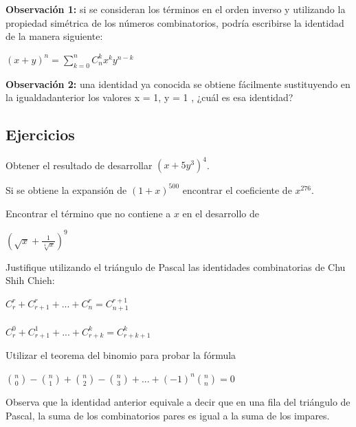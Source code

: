 \textbf{Observación 1:} si se consideran los términos en el orden inverso y utilizando la propiedad simétrica de los números combinatorios, podría escribirse la identidad de la manera siguiente:

\begin{center}
    $(x+y)^n=\displaystyle \sum_{k=0}^{n} C^{k}_{n} x^{k} y^{n-k}$
\end{center}

\textbf{Observación 2:} una identidad ya conocida se obtiene fácilmente sustituyendo en la igualdadanterior los valores x = 1, y = 1 , ¿cuál es esa identidad?

\subsection{Ejercicios}

\begin{ejercicio}
    Obtener el resultado de desarrollar $(x+ 5y^3)^4$.
\end{ejercicio}

\begin{ejercicio}
    Si se obtiene la expansión de $(1 +x)^{500}$ encontrar el coeficiente de $x^{276}$.
\end{ejercicio}

\begin{ejercicio}
    Encontrar el término que no contiene a $x$ en el desarrollo de

    \begin{center}
        $(\sqrt{x} + \frac{1}{\sqrt[4]{x}})^9$
    \end{center}
\end{ejercicio}

\begin{ejercicio}
    Justifique utilizando el triángulo de Pascal las identidades combinatorias de Chu Shih Chieh:

    \begin{center}
        $C^{r}_{r} + C^{r}_{r+1} + ... + C^{r}_{n} = C^{r+1}_{n+1}$ \\ \hfill \\
        $C^{0}_{r} + C^{1}_{r+1} + ... + C^{k}_{r+k} = C^{k}_{r+k+1}$
    \end{center}
\end{ejercicio}

\begin{ejercicio}
    Utilizar el teorema del binomio para probar la fórmula

    \begin{center}
        $\binom{n}{0} - \binom{n}{1} + \binom{n}{2} - \binom{n}{3} + ... + (-1)^n \binom{n}{n} = 0$
    \end{center}

    Observa que la identidad anterior equivale a decir que en una fila del triángulo de Pascal, la suma de los combinatorios pares es igual a la suma de los impares.
\end{ejercicio}

